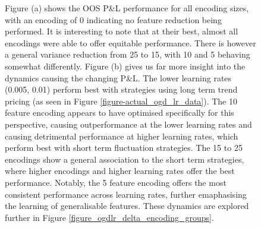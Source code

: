 \documentclass[a4paper,11pt,oneside]{article}
\theoremstyle{plain}
\theoremstyle{definition}
\begin{document}
\begin{figure}[H]
{		\newline Figure (a) shows the OOS P\&L performance for all encoding sizes, with an encoding of 0 indicating no feature reduction being performed. It is interesting to note that at their best, almost all encodings were able to offer equitable performance. There is however a general variance reduction from 25 to 15, with 10 and 5 behaving somewhat differently. Figure (b) gives us far more insight into the dynamics causing the changing P\&L. The lower learning rates (0.005, 0.01) perform best with strategies using long term trend pricing (as seen in Figure \ref{figure-actual_ogd_lr_data}). The 10 feature encoding appears to have optimised specifically for this perspective, causing outperformance at the lower learning rates and causing detrimental performance at higher learning rates, which perform best with short term fluctuation strategies. The 15 to 25 encodings show a general association to the short term strategies, where higher encodings and higher learning rates offer the best performance. Notably, the 5 feature encoding offers the most consistent performance across learning rates, further emaphasising the learning of generalisable features. These dynamics are explored further in Figure \ref{figure_ogdlr_delta_encoding_groups}.}
	\label{figure-encoding_pl_median}
	\end{figure}
		
\end{document}
